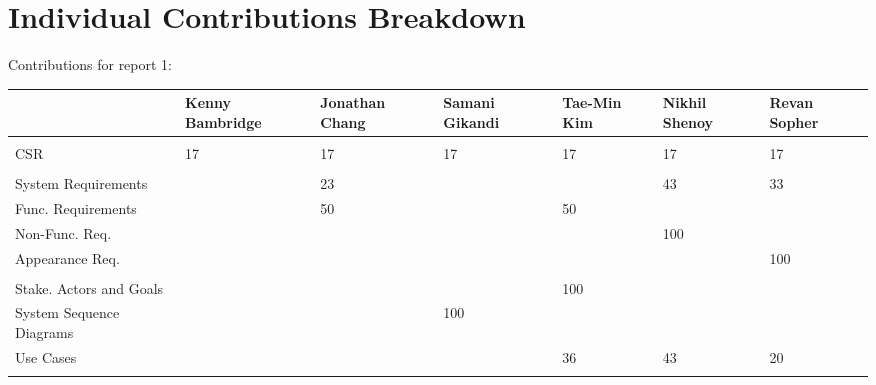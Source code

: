 \documentclass[letterpaper,english, 12pt]{scrreprt}
\begin{document}
\chapter*{Individual Contributions Breakdown}
Contributions for report 1:\\
\begin{center}
	\begin{tabular}{|l|C{2cm}|C{1.5cm}|C{1.5cm}|C{1.5cm}|C{1.5cm}|C{1.5cm}|}
		\hline
                        &Kenny Bambridge& Jonathan Chang& Samani Gikandi& Tae-Min Kim   & Nikhil Shenoy & Revan Sopher  \\ \hline
                        &               &               &               &               &               &               \\ \hline
CSR                     &      17       &      17       &       17      &      17       &       17      &       17      \\ \hline
                        &               &               &               &               &               &               \\ \hline

System Requirements     &               &      23       &               &               &       43      &       33      \\ \hline
Func. Requirements      &               &      50       &               &      50       &               &               \\ \hline
Non-Func. Req.          &               &               &               &               &      100      &               \\ \hline
Appearance Req.         &               &               &               &               &               &      100      \\ \hline
                        &               &               &               &               &               &               \\ \hline

Stake. Actors and Goals &               &               &               &     100       &               &               \\ \hline
System Sequence Diagrams&               &               &      100      &               &               &               \\ \hline
Use Cases               &               &               &               &      36       &       43      &       20      \\ \hline
                        &               &               &               &               &               &               \\ \hline


\end{tabular}
\end{center}
\end{document}
